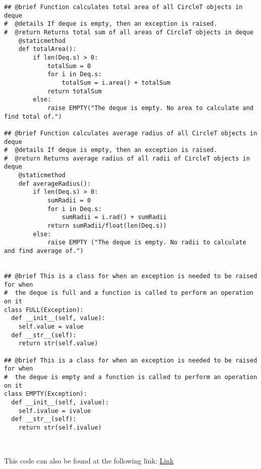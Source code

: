 \documentclass[12pt]{article}
\begin{document}
\begin{lstlisting}
## @brief Function calculates total area of all CircleT objects in deque
#  @details If deque is empty, then an exception is raised.
#  @return Returns total sum of all areas of CircleT objects in deque
    @staticmethod
    def totalArea():
        if len(Deq.s) > 0:
            totalSum = 0
            for i in Deq.s:
                totalSum = i.area() + totalSum
            return totalSum
        else:
            raise EMPTY("The deque is empty. No area to calculate and find total of.")

## @brief Function calculates average radius of all CircleT objects in deque
#  @details If deque is empty, then an exception is raised.
#  @return Returns average radius of all radii of CircleT objects in deque
    @staticmethod
    def averageRadius():
        if len(Deq.s) > 0:
            sumRadii = 0
            for i in Deq.s:
                sumRadii = i.rad() + sumRadii
            return sumRadii/float(len(Deq.s))
        else:
            raise EMPTY ("The deque is empty. No radii to calculate and find average of.")

                                   
## @brief This is a class for when an exception is needed to be raised for when
#  the deque is full and a function is called to perform an operation on it                    
class FULL(Exception):
  def __init__(self, value):
    self.value = value
  def __str__(self):
    return str(self.value)

## @brief This is a class for when an exception is needed to be raised for when
#  the deque is empty and a function is called to perform an operation on it                      
class EMPTY(Exception):
  def __init__(self, ivalue):
    self.ivalue = ivalue
  def __str__(self):
    return str(self.ivalue)
\end{lstlisting}

~\newline

\noindent This code can also be found at the following link:
\href{https://gitlab.cas.mcmaster.ca/se2aa4_cs2me3_assignments/patelm16/blob/master/A2/src/deque.py}{Link}

\newpage
\end{document}
